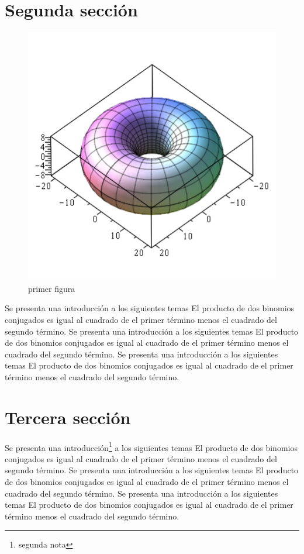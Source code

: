 \documentclass[12pt]{article}
\begin{document}
\begin{multicols}{2}
\section{Segunda sección}
\begin{figure}[H]
\centering
\includegraphics[scale=0.5]{figuras/fig3d_3}
\caption{primer figura}
\end{figure}
Se presenta una introducción a los siguientes temas El producto de dos binomios conjugados es igual al cuadrado de el primer término menos el cuadrado del segundo término.
Se presenta una introducción a los siguientes temas El producto de dos binomios conjugados es igual al cuadrado de el primer término menos el cuadrado del segundo término.
Se presenta una introducción a los siguientes temas El producto de dos binomios conjugados es igual al cuadrado de el primer término menos el cuadrado del segundo término.
\section{Tercera sección}
Se presenta una introducción\footnote{segunda nota} a los siguientes temas El producto de dos binomios conjugados es igual al cuadrado de el primer término menos el cuadrado del segundo término.
Se presenta una introducción a los siguientes temas El producto de dos binomios conjugados es igual al cuadrado de el primer término menos el cuadrado del segundo término.
Se presenta una introducción a los siguientes temas El producto de dos binomios conjugados es igual al cuadrado de el primer término menos el cuadrado del segundo término.

\end{multicols}
\end{document}
